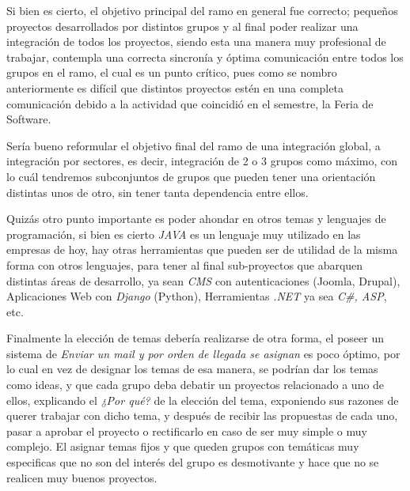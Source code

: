 
Si bien es cierto, el objetivo principal del ramo en general fue correcto;
pequeños proyectos desarrollados por distintos grupos y al final poder
realizar una integración de todos los proyectos, siendo esta una manera
muy profesional de trabajar, contempla una correcta sincronía y óptima comunicación
entre todos los grupos en el ramo, el cual es un punto crítico, pues como se nombro
anteriormente es difícil que distintos proyectos estén en una completa comunicación
debido a la actividad que coincidió en el semestre, la Feria de Software.

Sería bueno reformular el objetivo final del ramo de una integración global,
a integración por sectores, es decir, integración de 2 o 3 grupos como máximo,
con lo cuál tendremos subconjuntos de grupos que pueden tener una orientación
distintas unos de otro, sin tener tanta dependencia entre ellos.

Quizás otro punto importante es poder ahondar en otros temas y lenguajes de programación,
si bien es cierto \emph{JAVA} es un lenguaje muy utilizado en las empresas de hoy,
hay otras herramientas que pueden ser de utilidad de la misma forma con otros lenguajes,
para tener al final sub-proyectos que abarquen distintas áreas de desarrollo,
ya sean \emph{CMS} con autenticaciones (Joomla, Drupal), Aplicaciones Web con \emph{Django} (Python),
Herramientas \emph{.NET} ya sea \emph{C\#, ASP}, etc.

Finalmente la elección de temas debería realizarse de otra forma,
el poseer un sistema de \emph{Enviar un mail y por orden de llegada se asignan} es poco
óptimo, por lo cual en vez de designar los temas de esa manera, se podrían dar
los temas como ideas, y que cada grupo deba debatir un proyectos relacionado a
uno de ellos, explicando el \emph{¿Por qué?} de la elección del tema,
exponiendo sus razones de querer trabajar con dicho tema,
y después de recibir las propuestas de cada uno, pasar a aprobar el proyecto o
rectificarlo en caso de ser muy simple o muy complejo. El asignar temas fijos
y que queden grupos con temáticas muy especificas que no son del interés del
grupo es desmotivante y hace que no se realicen muy buenos proyectos.
